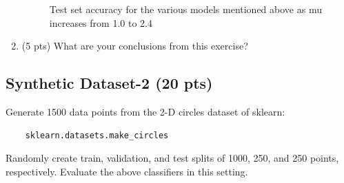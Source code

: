 \documentclass[a4paper]{article}
\theoremstyle{definition}
\newenvironment{soln}{
    \leavevmode\color{blue}\ignorespaces
}{}
\begin{document}
\begin{enumerate}
\begin{soln}
\begin{figure}[H]
        \caption{ Test set accuracy for the various models mentioned above as mu increases from 1.0 to 2.4}
    \end{figure}
\end{soln}
\item (5 pts) What are your conclusions from this exercise?
\end{enumerate}
\subsection{Synthetic Dataset-2 (20 pts)}
Generate 1500 data points from the 2-D circles dataset of sklearn:\begin{verbatim}
    sklearn.datasets.make_circles
\end{verbatim}
Randomly create train, validation, and test splits of 1000, 250, and 250 points, respectively. Evaluate the above classifiers in this setting.
\end{document}
